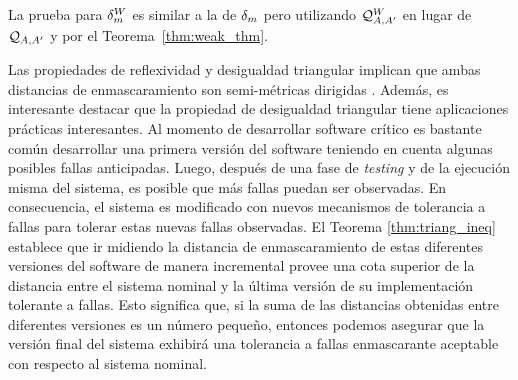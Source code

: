 La prueba para $\delta_{m}^W$ es similar a la de $\delta_{m}$ 
pero utilizando $\mathcal{Q}^W_{A,A'}$ en lugar de $\mathcal{Q}_{A, A'}$ y por el Teorema~\ref{thm:weak_thm}.

Las propiedades de reflexividad y desigualdad triangular implican que ambas distancias de enmascaramiento son semi-métricas dirigidas \cite{CharikarMM06,AlfaroMRS08}. Además, es interesante destacar que la propiedad de desigualdad triangular tiene aplicaciones prácticas interesantes. Al momento de desarrollar software crítico es bastante común desarrollar una primera versión del software teniendo en cuenta algunas posibles fallas anticipadas. 
Luego, después de una fase de \textit{testing} y de la ejecución misma del sistema, es posible que más fallas puedan ser observadas. En consecuencia, el sistema es modificado con nuevos mecanismos de tolerancia a fallas para tolerar estas nuevas fallas observadas. 
El Teorema \ref{thm:triang_ineq} establece que ir midiendo la distancia de enmascaramiento de estas diferentes versiones del software de manera incremental provee una cota superior de la distancia entre el sistema nominal y la última versión de su implementación tolerante a fallas. Esto significa que, si la suma de las distancias obtenidas entre diferentes versiones es un número pequeño, entonces podemos asegurar que la versión final del sistema exhibirá una tolerancia a fallas enmascarante aceptable con respecto al sistema nominal.